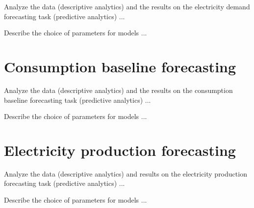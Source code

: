 Analyze the data (descriptive analytics) and the results on the electricity demand forecasting task (predictive analytics) ...

Describe the choice of parameters for models ...


\section{Consumption baseline forecasting}
\label{sec:baselineval}
\vspace{0.2 cm}

Analyze the data (descriptive analytics) and the results on the consumption baseline forecasting task (predictive analytics) ...

Describe the choice of parameters for models ...


\section{Electricity production forecasting}
\label{sec:productionval}
\vspace{0.2 cm}

Analyze the data (descriptive analytics)  and results on the electricity production forecasting task (predictive analytics) ...

Describe the choice of parameters for models ...
